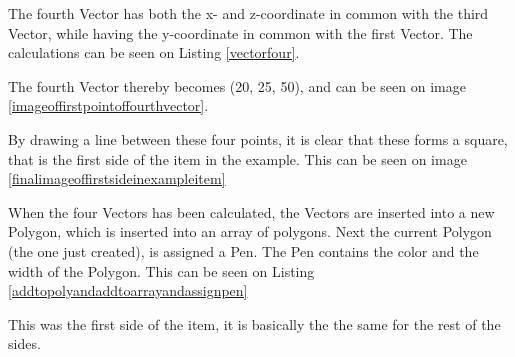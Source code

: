 The fourth Vector has both the x- and z-coordinate in common with the third Vector, while having the y-coordinate in common with the first Vector. The calculations can be seen on Listing \ref{vectorfour}.


The fourth Vector thereby becomes (20, 25, 50), and can be seen on image \ref{imageoffirstpointoffourthvector}.


By drawing a line between these four points, it is clear that these forms a square, that is the first side of the item in the example. This can be seen on image \ref{finalimageoffirstsideinexampleitem}

When the four Vectors has been calculated, the Vectors are inserted into a new Polygon, which is inserted into an array of polygons.  Next the current Polygon (the one just created), is assigned a Pen. The Pen contains the color and the width of the Polygon. This can be seen on Listing \ref{addtopolyandaddtoarrayandassignpen}


This was the first side of the item, it is basically the the same for the rest of the sides. 

